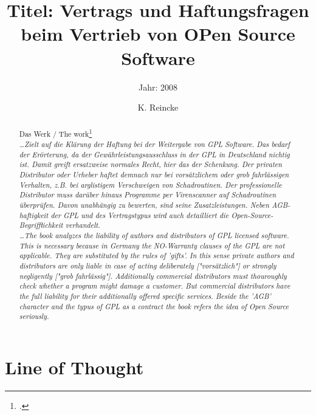 \documentclass[DIV=calc,BCOR=5mm,11pt,headings=small,oneside,abstract=true, toc=bib]{scrartcl}
\begin{document}

\titlehead{Literaturexzerpt}
\subject{Autor(en): Oberhem}
\title{Titel: Vertrags und Haftungsfragen beim Vertrieb von OPen Source
Software}
\subtitle{Jahr: 2008}
\author{K. Reincke}

\maketitle

\begin{abstract}
\noindent
Das Werk / The work\footcite[][]{Oberhem2008a} \\
\noindent \itshape
\ldots Zielt auf die Klärung der Haftung bei der Weitergabe von GPL Software.
Das bedarf der Erörterung, da der Gewährleistungsausschluss in der GPL in
Deutschland nichtig ist. Damit greift ersatzweise normales Recht, hier das der
Schenkung. Der privaten Distributor oder Urheber haftet demnach nur bei
vorsätzlichem oder grob fahrlässigen Verhalten, z.B. bei arglistigem
Verschweigen von Schadroutinen. Der professionelle Distributor muss darüber
hinaus Programme per Virenscanner auf Schadroutinen überprüfen. Davon unabhängig
zu bewerten, sind seine Zusatzleistungen. Neben AGB-haftigkeit der GPL und des
Vertragstypus wird auch detailliert die Open-Source-Begrifflichkeit verhandelt.
\\
\noindent
\ldots The book analyzes the liability of authors and distributors of GPL
licensed software. This is necessary because in Germany the NO-Warranty clauses
of the GPL are not applicable. They are substituted by the rules of 'gifts'. In
this sense private authors and distributors are only liable in case of acting
deliberately ["vorsätzlich"] or strongly negligently ["grob fahrlässig"].
Additionally commercial distributors must thouroughly check whether a program
might damage a customer. But commercial distributors have the full liability for
their additionally offered specific services. Beside the 'AGB' character and the
typus of GPL as a contract the book refers the idea of Open Source seriously.
\end{abstract}
\footnotesize
\normalsize

\section{Line of Thought}
\end{document}
